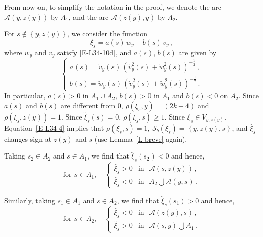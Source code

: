 \documentclass[12pt,a4paper]{amsart}
\theoremstyle{plain} %
\theoremstyle{definition}
\numberwithin{equation}{section}
\numberwithin{figure}{section}
\numberwithin{table}{section}
\newcommand{\cA}{\mathcal{A}}
\newcommand{\cS}{\mathcal{S}}
\newcommand{\set}[1]{\left\lbrace #1 \right\rbrace}
\begin{document}
From now on, to simplify the notation in the proof,  we denote the arc $\mathcal A(y,z(y))$  by $A_1$, and the arc $\mathcal A(z(y),y)$ by $A_2$.\smallskip

For $s \not \in \set{y,z(y)}$, we consider the function
%
\begin{equation}\label{E-L34-12}
\xi_s = a(s) \, w_y - b(s) \, v_y\,,
\end{equation}
%
where $w_y$ and $v_y$ satisfy \eqref{E-L34-10d}, and $a(s)$, $b(s)$ are given by
\begin{equation}\label{E-L34-14}
\left\{
\begin{array}{l}
a(s) =\breve{v}_y(s)\, \left( \breve{v}^2_y(s) + \breve{w}^2_y(s) \right)^{- \frac 12}\,,\\[5pt]
b(s) = \breve{w}_y(s) \, \left( \breve{v}^2_y(s) + \breve{w}^2_y(s) \right)^{- \frac 12}\,.
\end{array}
\right.
\end{equation}
%
In particular, $a(s) > 0$ in $A_1 \cup A_2$, $b(s) > 0$ in $A_1$ and $b(s) < 0$ on $A_2$. \smallskip
Since $a(s)$ and $b(s)$ are different from $0$, $\rho(\xi_s,y) = (2k-4)$ and $\rho(\xi_s,z(y))=1$. Since $\breve{\xi}_s(s) =0$, $\rho(\xi_s,s) \ge 1$. Since $\xi_s \in V_{y,z(y)}$,  Equation~\eqref{E-L34-4} implies that $\rho(\xi_s,s) = 1$, $\cS_b(\xi_s) = \set{y,z(y),s}$, and $\breve{\xi_s}$ changes sign at $z(y)$ and $s$  (use Lemma~\ref{L-breve} again).\smallskip

Taking $s_2 \in A_2$ and $s \in A_1$, we find that $\breve{\xi}_s(s_2) < 0$ and hence,
%
\begin{equation}\label{E-L34-14a}
\text{for~} s \in A_1, \quad \left\{
\begin{array}{ll}
\breve{\xi_s} > 0 & \text{in~~} \cA(s, z(y))\,,\\[5pt]
\breve{\xi_s} < 0 & \text{in~~} A_2 \bigcup \cA(y,s)\,.
\end{array}
\right.
\end{equation}

Similarly, taking $s_1 \in A_1$ and $s \in A_2$, we find that $\breve{\xi}_s(s_1) > 0$ and hence,
%
\begin{equation}\label{E-L34-14b}
\text{for~} s \in A_2, \quad \left\{
\begin{array}{ll}
\breve{\xi_s} < 0 & \text{in~~} \cA(z(y), s)\,,\\[5pt]
\breve{\xi_s} > 0 & \text{in~~} \cA(s,y) \bigcup A_1 \,.
\end{array}
\right.
\end{equation}
\end{document}
